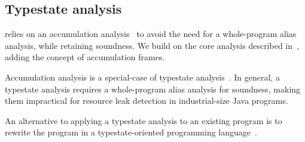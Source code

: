 \subsection{Typestate analysis}
\label{sec:rw-typestate}

\Tool relies on an accumulation
analysis~\cite{KelloggRSSE2020,FahndrichLeino03} to avoid the need
for a whole-program alias analysis, while retaining soundness.  We
build on the core analysis described in~\cite{KelloggRSSE2020},
adding the concept of accumulation frames.

Accumulation analysis is a special-case of typestate analysis~\cite{StromY86}.
In general, a typestate analysis requires a whole-program alias analysis
for soundness, making them impractical for resource leak detection
in industrial-size Java programs. 

An alternative to applying a typestate analysis to an existing program
is to rewrite the program in a typestate-oriented programming
language~\cite{AldrichSSS2009}.   
